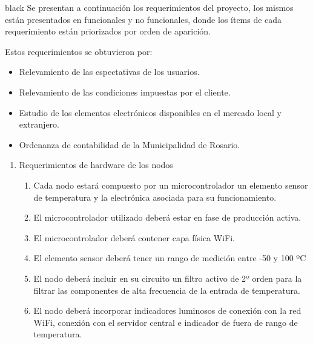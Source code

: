 \documentclass[11pt]{charter}
\begin{document}
\begin{consigna}{black}
Se presentan a continuación los requerimientos del proyecto, los mismos están presentados en funcionales y no funcionales, donde los ítems de cada requerimiento están priorizados por orden de aparición.

Estos requerimientos se obtuvieron por:
\begin{itemize}
\item Relevamiento de las espectativas de los usuarios.
\item Relevamiento de las condiciones impuestas por el cliente.
\item Estudio de los elementos electrónicos disponibles en el mercado local y extranjero.
\item Ordenanza de contabilidad de la Municipalidad de Rosario.
\end{itemize}

\begin{enumerate}
\item Requerimientos de hardware de los nodos
	\begin{enumerate}
	\item Cada nodo estará compuesto por un microcontrolador un elemento sensor de temperatura y la electrónica asociada para su funcionamiento.
	\item El microcontrolador utilizado deberá estar en fase de producción activa.
	\item El microcontrolador deberá contener capa física WiFi.	
	\item El elemento sensor deberá tener un rango de medición entre -50 y 100 ºC
	\item El nodo deberá incluir en su circuito un filtro activo de 2º orden para la filtrar las componentes de alta frecuencia de la entrada de temperatura.
	\item El nodo deberá incorporar indicadores luminosos de conexión con la red WiFi, conexión con el servidor central e indicador de fuera de rango de temperatura.	
	\end{enumerate}
	

\end{enumerate}
\end{consigna}
\end{document}
